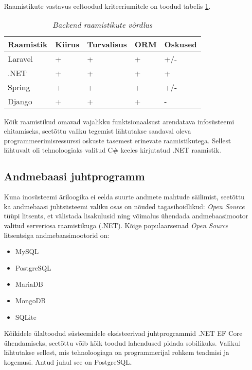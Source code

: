 Raamistikute vastavus eeltoodud kriteeriumitele on toodud tabelis \ref{tab:requirements}.
\begin{longtable}{|p{3cm}|p{2.5cm}|p{2.5cm}|p{2.5cm}|p{2.5cm}|}
	\caption{\it{Backend raamistikute võrdlus}}
	\label{tab:requirements}\\ \hline
	\textbf{Raamistik} &  \textbf{Kiirus} & \textbf{Turvalisus}  & \textbf{ORM} & \textbf{Oskused} \\
	\hline
	\endhead
	\endfoot
	\hline
	\endlastfoot
Laravel & + & + & + & +/-  \\ \hline
.NET    & + & + & + & +  \\ \hline
Spring  & + & + & + & +/-  \\ \hline
Django  & + & + & + & -  \\ \hline
\end{longtable}

Kõik raamistikud omavad vajalikku funktsionaalsust arendatava infosüsteemi ehitamiseks, seetõttu valiku tegemist 
lähtutakse saadaval oleva programmeerimisressurssi oskuste tasemest erinevate raamistikutega. Sellest lähtuvalt
oli tehnoloogiaks valitud C\# keeles kirjutatud .NET raamistik.

\subsection{Andmebaasi juhtprogramm}
Kuna inosüsteemi äriloogika ei eelda suurte andmete mahtude säilimist, seetõttu ka andmebaasi juhtsüsteemi 
valiku osas on nõuded tagasihoidlikud: \textit{Open Source} tüüpi litsents, et välistada lisakulusid ning
võimalus ühendada andmebaasimootor valitud serveriosa raamistikuga (.NET). Kõige populaarsemad 
\textit{Open Source} litsentsiga andmebaasimootorid on:
\begin{itemize}
    \item MySQL
    \item PostgreSQL
    \item MariaDB
    \item MongoDB
    \item SQLite
\end{itemize}
Kõikidele ülaltoodud süsteemidele eksisteerivad juhtprogrammid .NET EF Core ühendamiseks, seetõttu võib kõik
toodud lahendused pidada sobilikuks. Valikul lähtutakse sellest, mis tehnoloogiaga on programmerijal rohkem teadmisi 
ja kogemusi. Antud juhul see on PostgreSQL. 

